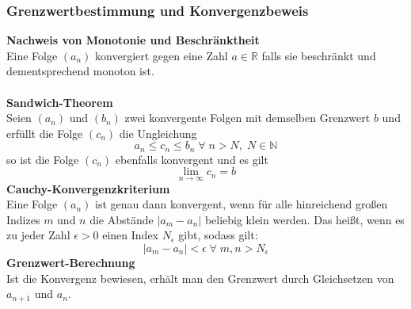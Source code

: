 \documentclass[a4paper,twocolumn,10pt]{article}
\begin{document}
\subsubsection{Grenzwertbestimmung und Konvergenzbeweis}
\textbf{Nachweis von Monotonie und Beschränktheit}\\
Eine Folge $(a_n)$ konvergiert gegen eine Zahl $a\in\mathbb{R}$ falls sie beschränkt und dementsprechend monoton ist.\\\\
\textbf{Sandwich-Theorem}\\
Seien $(a_n)$ und $(b_n)$ zwei konvergente Folgen mit demselben Grenzwert $b$ und erfüllt die Folge $(c_n)$ die Ungleichung
\begin{equation*}
a_n\leq c_n\leq b_n\;\forall\;n>N,\;N\in \mathbb{N}
\end{equation*}
so ist die Folge $(c_n)$ ebenfalls konvergent und es gilt
\begin{equation*}
\lim\limits_{n\rightarrow\infty}c_n=b
\end{equation*}
\textbf{Cauchy-Konvergenzkriterium}\\
Eine Folge $(a_n)$ ist genau dann konvergent, wenn für alle hinreichend großen Indizes $m$ und $n$ die Abstände $|a_m-a_n|$ beliebig klein werden.
Das heißt, wenn es zu jeder Zahl $\epsilon>0$ einen Index $N_{\epsilon}$ gibt, sodass gilt:
\begin{equation*}
|a_m-a_n|<\epsilon\;\forall\;m,n>N_{\epsilon}
\end{equation*}
\textbf{Grenzwert-Berechnung}\\
Ist die Konvergenz bewiesen, erhält man den Grenzwert durch Gleichsetzen von $a_{n+1}$ und $a_n$.
\end{document}
